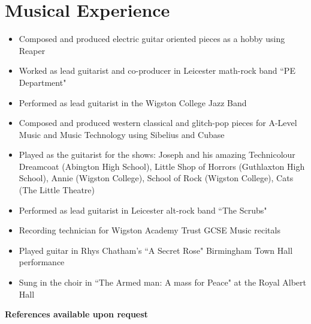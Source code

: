 \documentclass{article}
\begin{document}
\section{Musical Experience}
\begin{itemize}[noitemsep]

\renewcommand{\labelitemi}{$\square$}

\item Composed and produced electric guitar oriented pieces as a hobby using Reaper
\item Worked as lead guitarist and co-producer in Leicester math-rock band ``PE Department"
\item Performed as lead guitarist in the Wigston College Jazz Band
\item Composed and produced western classical and glitch-pop pieces for A-Level Music and Music Technology using Sibelius and Cubase
\item Played as the guitarist for the shows: Joseph and his amazing Technicolour Dreamcoat (Abington High School), Little Shop of Horrors (Guthlaxton High School), Annie (Wigston College), School of Rock (Wigston College), Cats (The Little Theatre)
\item Performed as lead guitarist in Leicester alt-rock band ``The Scrubs"
\item Recording technician for Wigston Academy Trust GCSE Music recitals
\item Played guitar in Rhys Chatham's ``A Secret Rose" Birmingham Town Hall performance
\item Sung in the choir in ``The Armed man: A mass for Peace" at the Royal Albert Hall


\end{itemize}


\begin{center}

\vskip 0.5cm
\textbf{References available upon request}

\end{center}
\end{document}
